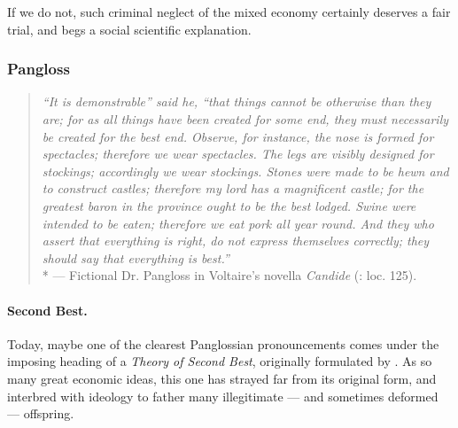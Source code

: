 \documentclass[11pt,a4paper,oneside,openright]{article}
\begin{document}
If we do not, such criminal neglect of the mixed economy certainly deserves a fair trial, and begs a social scientific explanation.


\subsubsection{Pangloss} \label{sec:Pangloss}

\begin{quote}
	\emph{``It is demonstrable'' said he, ``that things cannot be otherwise than they are; for as all things have been created for some end, they must necessarily be created for the best end. 
	Observe, for instance, the nose is formed for spectacles; therefore we wear spectacles. 
	The legs are visibly designed for stockings; accordingly we wear stockings. 
	Stones were made to be hewn and to construct castles; therefore my lord has a magnificent castle; for the greatest baron in the province ought to be the best lodged. 
	Swine were intended to be eaten; therefore we eat pork all year round. 
	And they who assert that everything is right, do not express themselves correctly; they should say that everything is best.''}\\*
	--- Fictional Dr. Pangloss in Voltaire's novella \emph{Candide} (\citeyear{Voltaire1759}: loc. 125).
\end{quote}

\paragraph{Second Best.} Today, maybe one of the clearest Panglossian pronouncements comes under the imposing heading of a \emph{Theory of Second Best}, originally formulated by \cite{Lancaster1956}. 
As so many great economic ideas, this one has strayed far from its original form, and interbred with ideology to father many illegitimate --- and sometimes  deformed --- offspring. 
\end{document}
